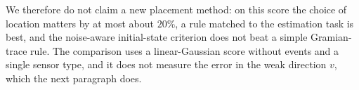 \documentclass[conference]{IEEEtran}
\begin{document}
We therefore do not claim a new placement method: on this score the choice of location matters by at most about $20\%$, a rule matched to the estimation task is best, and the noise-aware initial-state criterion does not beat a simple Gramian-trace rule. The comparison uses a linear-Gaussian score without events and a single sensor type, and it does not measure the error in the weak direction $v$, which the next paragraph does.

\begin{table}[t]
\centering
\caption{Placement criteria: Kalman-filter error relative to the best set.}
\label{tab:placement}
\small
{}
\end{table}
\end{document}
